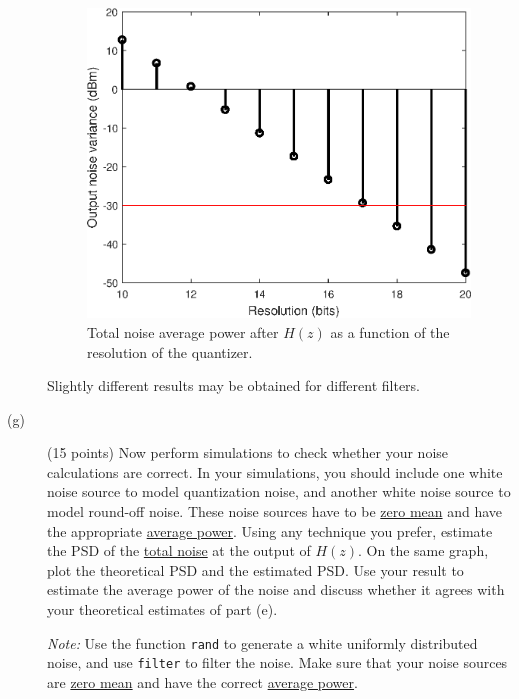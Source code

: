 \documentclass[10pt]{article}
\begin{document}
\begin{description}
{	\FloatBarrier
	\begin{figure}[h!]
		\centering
		\includegraphics[scale=0.6]{figs/hearing_aid_total_noise_var.eps}
		\caption{Total noise average power after $H(z)$ as a function of the resolution of the quantizer.}
	\end{figure}
	\FloatBarrier
	
		Slightly different results may be obtained for different filters.
	}\fi
	
		
	\item[(g)] (15 points) Now perform simulations to check whether your noise calculations are correct. In your simulations, you should include one white noise source to model quantization noise, and another white noise source to model round-off noise. These noise sources have to be \underline{zero mean} and have the appropriate \underline{average power}. Using any technique you prefer, estimate the PSD of the \underline{total noise} at the output of $H(z)$. On the same graph, plot the theoretical PSD and the estimated PSD. Use your result to estimate the average power of the noise and discuss whether it agrees with your theoretical estimates of part (e).
	
	\noindent\textit{Note:} Use the function \texttt{rand} to generate a white uniformly distributed noise, and use \texttt{filter} to filter the noise. Make sure that your noise sources are \underline{zero mean} and have the correct \underline{average power}.
	

\end{description}
\end{document}
